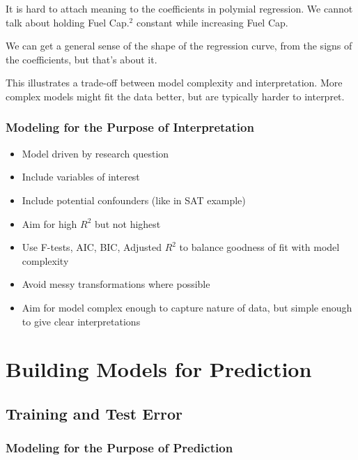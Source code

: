\documentclass[]{book}
\providecommand{\tightlist}{%
  \setlength{\itemsep}{0pt}\setlength{\parskip}{0pt}}
\begin{document}
It is hard to attach meaning to the coefficients in polymial regression.
We cannot talk about holding Fuel Cap.\(^2\) constant while increasing
Fuel Cap.

We can get a general sense of the shape of the regression curve, from
the signs of the coefficients, but that's about it.

This illustrates a trade-off between model complexity and
interpretation. More complex models might fit the data better, but are
typically harder to interpret.

\subsection{Modeling for the Purpose of
Interpretation}\label{modeling-for-the-purpose-of-interpretation}

\begin{itemize}
\tightlist
\item
  Model driven by research question
\item
  Include variables of interest\\
\item
  Include potential confounders (like in SAT example)\\
\item
  Aim for high \(R^2\) but not highest\\
\item
  Use F-tests, AIC, BIC, Adjusted \(R^2\) to balance goodness of fit
  with model complexity\\
\item
  Avoid messy transformations where possible\\
\item
  Aim for model complex enough to capture nature of data, but simple
  enough to give clear interpretations
\end{itemize}

\chapter{Building Models for
Prediction}\label{building-models-for-prediction}

\section{Training and Test Error}\label{training-and-test-error}

\subsection{Modeling for the Purpose of
Prediction}\label{modeling-for-the-purpose-of-prediction}
\end{document}
